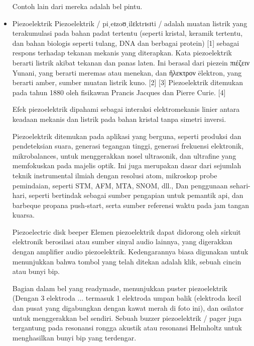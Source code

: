 \begin{itemize}
Contoh lain dari mereka adalah bel pintu.
\item Piezoelektrik
Piezoelektrik / piˌeɪzoʊˌilɛktrɪsɪti / adalah muatan listrik yang terakumulasi pada bahan padat tertentu (seperti kristal, keramik tertentu, dan bahan biologis 
seperti tulang, DNA dan berbagai protein) [1] sebagai respons terhadap tekanan mekanis yang diterapkan. Kata piezoelektrik berarti listrik akibat tekanan dan 
panas laten. Ini berasal dari piezein πιέζειν Yunani, yang berarti meremas atau menekan, dan ἤλεκτρον ēlektron, yang berarti amber, sumber muatan listrik kuno.
[2] [3] Piezoelektrik ditemukan pada tahun 1880 oleh fisikawan Prancis Jacques dan Pierre Curie. [4]

Efek piezoelektrik dipahami sebagai interaksi elektromekanis linier antara keadaan mekanis dan listrik pada bahan kristal tanpa simetri inversi.

Piezoelektrik ditemukan pada aplikasi yang berguna, seperti produksi dan pendeteksian suara, generasi tegangan tinggi, generasi frekuensi elektronik, mikrobalances, 
untuk menggerakkan nosel ultrasonik, dan ultrafine yang memfokuskan pada majelis optik. Ini juga merupakan dasar dari sejumlah teknik instrumental ilmiah dengan 
resolusi atom, mikroskop probe pemindaian, seperti STM, AFM, MTA, SNOM, dll., Dan penggunaan sehari-hari, seperti bertindak sebagai sumber pengapian untuk pemantik 
api, dan barbeque propana push-start, serta sumber referensi waktu pada jam tangan kuarsa.

Piezoelectric disk beeper
Elemen piezoelektrik dapat didorong oleh sirkuit elektronik berosilasi atau sumber sinyal audio lainnya, yang digerakkan dengan amplifier audio piezoelektrik. Kedengarannya biasa digunakan untuk menunjukkan bahwa tombol yang telah ditekan adalah klik, sebuah cincin atau bunyi bip.

Bagian dalam bel yang readymade, menunjukkan puster piezoelektrik (Dengan 3 elektroda ... termasuk 1 elektroda umpan balik (elektroda kecil dan pusat yang digabungkan dengan kawat merah di foto ini), dan osilator untuk menggerakkan bel sendiri.
Sebuah buzzer piezoelektrik / pager juga tergantung pada resonansi rongga akustik atau resonansi Helmholtz untuk menghasilkan bunyi bip yang terdengar.
\end{itemize}

\cite{series1994atlas}

